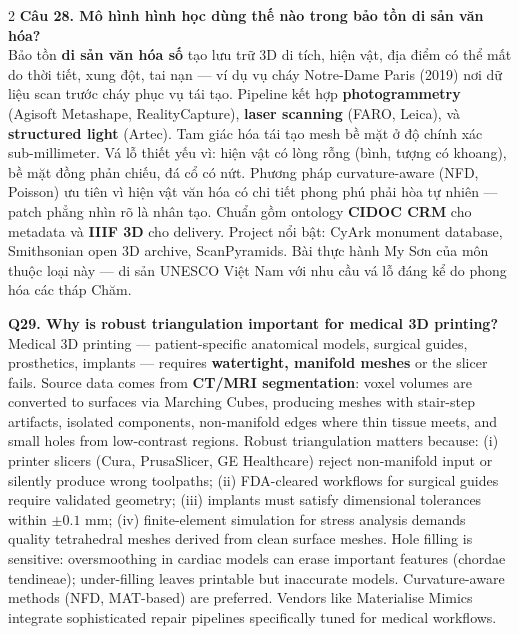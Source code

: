 \begin{paracol}{2}
\textbf{Câu 28. Mô hình hình học dùng thế nào trong bảo tồn di sản văn hóa?}\\
Bảo tồn \textbf{di sản văn hóa số} tạo lưu trữ 3D di tích, hiện vật, địa điểm có thể mất do thời tiết, xung đột, tai nạn — ví dụ vụ cháy Notre-Dame Paris (2019) nơi dữ liệu scan trước cháy phục vụ tái tạo. Pipeline kết hợp \textbf{photogrammetry} (Agisoft Metashape, RealityCapture), \textbf{laser scanning} (FARO, Leica), và \textbf{structured light} (Artec). Tam giác hóa tái tạo mesh bề mặt ở độ chính xác sub-millimeter. Vá lỗ thiết yếu vì: hiện vật có lòng rỗng (bình, tượng có khoang), bề mặt đồng phản chiếu, đá cổ có nứt. Phương pháp curvature-aware (NFD, Poisson) ưu tiên vì hiện vật văn hóa có chi tiết phong phú phải hòa tự nhiên — patch phẳng nhìn rõ là nhân tạo. Chuẩn gồm ontology \textbf{CIDOC CRM} cho metadata và \textbf{IIIF 3D} cho delivery. Project nổi bật: CyArk monument database, Smithsonian open 3D archive, ScanPyramids. Bài thực hành My Sơn của môn thuộc loại này — di sản UNESCO Việt Nam với nhu cầu vá lỗ đáng kể do phong hóa các tháp Chăm.

\switchcolumn*

\textbf{Q29. Why is robust triangulation important for medical 3D printing?}\\
Medical 3D printing — patient-specific anatomical models, surgical guides, prosthetics, implants — requires \textbf{watertight, manifold meshes} or the slicer fails. Source data comes from \textbf{CT/MRI segmentation}: voxel volumes are converted to surfaces via Marching Cubes, producing meshes with stair-step artifacts, isolated components, non-manifold edges where thin tissue meets, and small holes from low-contrast regions. Robust triangulation matters because: (i) printer slicers (Cura, PrusaSlicer, GE Healthcare) reject non-manifold input or silently produce wrong toolpaths; (ii) FDA-cleared workflows for surgical guides require validated geometry; (iii) implants must satisfy dimensional tolerances within $\pm 0.1$ mm; (iv) finite-element simulation for stress analysis demands quality tetrahedral meshes derived from clean surface meshes. Hole filling is sensitive: oversmoothing in cardiac models can erase important features (chordae tendineae); under-filling leaves printable but inaccurate models. Curvature-aware methods (NFD, MAT-based) are preferred. Vendors like Materialise Mimics integrate sophisticated repair pipelines specifically tuned for medical workflows.

\switchcolumn


\end{paracol}
